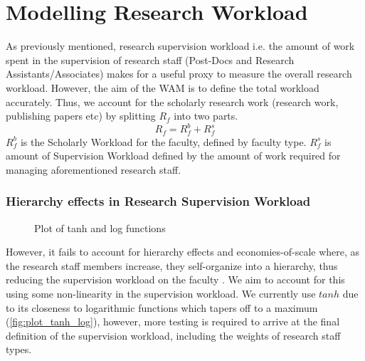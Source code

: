 \section{Modelling Research Workload}
As previously mentioned, research supervision workload i.e. the amount of work spent in the supervision of research staff (Post-Docs and Research Assistants/Associates) \cite{rohan2017} makes for a useful proxy to measure the overall research workload. However, the aim of the WAM is to define the total workload accurately. Thus, we account for the scholarly research work (research work, publishing papers etc) by splitting \(R_f\) into two parts.
\[R_f = R^b_f + R^s_f\]
\(R^b_f\) is the Scholarly Workload for the faculty, defined by faculty type. \(R^s_f\) is amount of Supervision Workload defined by the amount of work required for managing aforementioned research staff.
\subsubsection{Hierarchy effects in Research Supervision Workload}
\begin{figure}[H]
    \centering
    \caption{Plot of tanh and log functions}
    \label{fig:plot_tanh_log}
\end{figure}
However, it fails to account for hierarchy effects and economies-of-scale where, as the research staff members increase, they self-organize into a hierarchy, thus reducing the supervision workload on the faculty \cite{WANG2015197,wellman1997electronic}. We aim to account for this using some non-linearity in the supervision workload. We currently use \(tanh\) due to its closeness to logarithmic functions which tapers off to a maximum (\autoref{fig:plot_tanh_log}), however, more testing is required to arrive at the final definition of the supervision workload, including the weights of research staff types.

